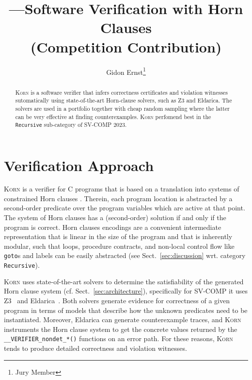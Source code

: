 \documentclass{llncs}
\author{Gidon Ernst\thanks{Jury Member}}
\title{\Korn---Software Verification with Horn Clauses \\ (Competition Contribution)}
\institute{LMU Munich, Munich, Germany, \email{gidon.ernst@lmu.de}}
\newcommand{\Korn}{\textsc{Korn}\xspace}
\begin{document}
\maketitle

\begin{abstract}
    \Korn is a software verifier that infers correctness certificates
    and violation witnesses
    sutomatically using state-of-the-art Horn-clause solvers, such as Z3 and Eldarica.
    The solvers are used in a portfolio together with cheap random sampling
    where the latter can be very effective at finding counterexamples.
    \Korn perfomend best in the \texttt{Recursive} sub-category of SV-COMP 2023.

\end{abstract}

\section{Verification Approach}
\label{sec:approach}

\Korn is a verifier for C programs that is based on a translation into systems of constrained Horn clauses
\cite{bjorner2015horn,gurfinkel2019science}.
Therein, each program location is abstracted by a second-order predicate
over the program variables which are active at that point.
The system of Horn clauses has a (second-order) solution if and only if the program is correct.
Horn clauses encodings are a convenient intermediate representation
that is linear in the size of the program
and that is inherently modular,
such that loops, procedure contracts, and non-local control flow like \texttt{goto}s and labels can be easily abstracted (see Sect.~\ref{sec:discussion} wrt. category \texttt{Recursive}).

\Korn uses state-of-the-art solvers to determine the satisfiability of the generated Horn clause system (cf. Sect.~\ref{sec:architecture}),
specifically for SV-COMP it uses Z3~\cite{bjorner2013solving} and Eldarica~\cite{hojjat2018eldarica}.
Both solvers generate evidence for correctness of a given program in terms of models that describe how the unknown predicates need to be instantiated.
Moreover, Eldarica can generate counterexample traces, and \Korn instruments the Horn clause system to get
the concrete values returned by the \texttt{\_\_VERIFIER\_nondet\_*()} functions on an error path.
For these reasons, \Korn tends to produce detailed correctness and violation witnesses.
\end{document}
